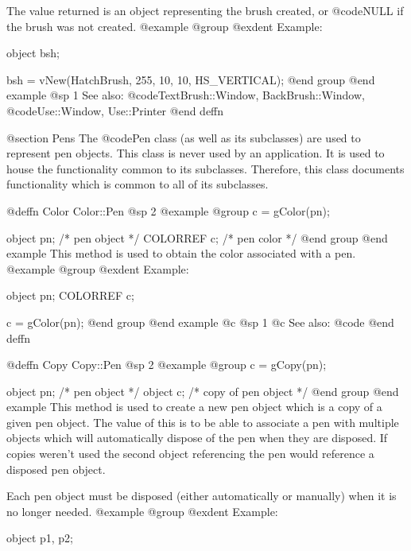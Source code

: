 The value returned is an object representing the brush created, or
@code{NULL} if the brush was not created.
@example
@group
@exdent Example:

object  bsh;

bsh = vNew(HatchBrush, 255, 10, 10, HS_VERTICAL);
@end group
@end example
@sp 1
See also:  @code{TextBrush::Window, BackBrush::Window,}
        @code{Use::Window, Use::Printer}
@end deffn









@section Pens
The @code{Pen} class (as well as its subclasses) are used to represent
pen objects.  This class is never used by an application.  It is used
to house the functionality common to its subclasses.  Therefore, this
class documents functionality which is common to all of its subclasses.









@deffn {Color} Color::Pen
@sp 2
@example
@group
c = gColor(pn);

object    pn;   /*  pen object   */
COLORREF  c;    /*  pen color    */
@end group
@end example
This method is used to obtain the color associated with a pen.
@example
@group
@exdent Example:

object    pn;
COLORREF  c;

c = gColor(pn);
@end group
@end example
@c @sp 1
@c See also:  @code{}
@end deffn










@deffn {Copy} Copy::Pen
@sp 2
@example
@group
c = gCopy(pn);

object  pn;     /*  pen object          */
object  c;      /*  copy of pen object  */
@end group
@end example
This method is used to create a new pen object which is a copy of a
given pen object.  The value of this is to be able to associate a
pen with multiple objects which will automatically dispose of the
pen when they are disposed.  If copies weren't used the second object
referencing the pen would reference a disposed pen object.

Each pen object must be disposed (either automatically or manually)
when it is no longer needed.
@example
@group
@exdent Example:

object  p1, p2;

